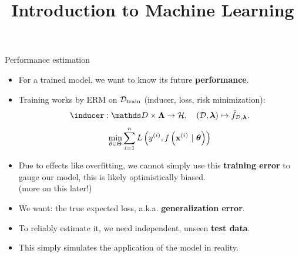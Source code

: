 





\newcommand{\titlefigure}{figure_man/eval_fig_title_intro}
\newcommand{\learninggoals}{
\item Understand the goal of performance estimation
\item Understand the difference between outer and inner loss
\item Know the formal definition of generalization error as a statistical estimator of
future performance}

\title{Introduction to Machine Learning}
\date{}



\sloppy


\begin{vbframe}{Performance estimation}

\begin{itemize}
  \item For a trained model, we want to know its future \textbf{performance}.
  \item Training works by ERM on $\mathcal{D}_{\text{train}}$ (inducer, loss, risk minimization):
  $$\inducer: \preimageInducerShort \rightarrow \Hspace, \quad (\D, \lamv)
  \mapsto \fhDlam.$$
  $$ \min_{\theta \in \Theta} \sum\limits_{i=1}^n L\left(y^{(i)}, f\left(\mathbf{x}^{(i)} ~|~ \bm{\theta}\right)\right) $$ 
  \item Due to effects like overfitting, we cannot simply use this \textbf{training error}
      to gauge our model, this is likely optimistically biased.\\ 
      (more on this later!)
  \item We want: the true expected loss, a.k.a. \textbf{generalization error}.
  \item To reliably estimate it, we need independent, unseen \textbf{test data}. 
  \item This simply simulates the application of the model in reality.    
\end{itemize}
\end{vbframe}

